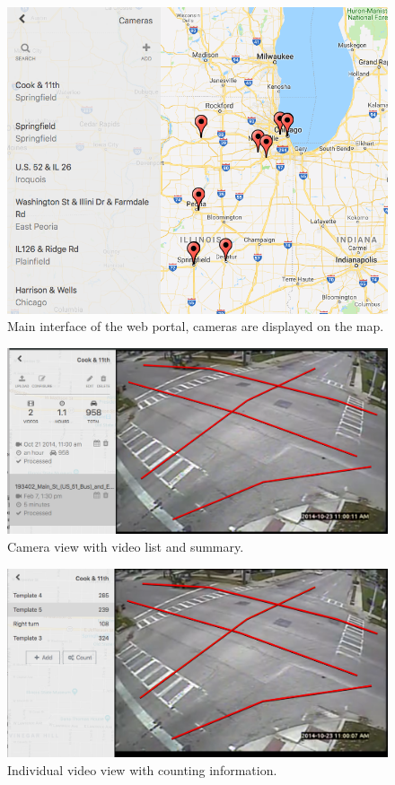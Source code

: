 \begin{figure}
    \centering
    \includegraphics[width=\linewidth]{./img/system/main.png}
    \caption{Main interface of the web portal, cameras are displayed on the map.}
    \label{fig:sys-main}
\end{figure}
\begin{figure}
    \centering
    \includegraphics[width=\linewidth]{./img/system/camera.png}
    \caption{Camera view with video list and summary.}
    \label{fig:sys-camera}
\end{figure}
\begin{figure}
    \centering
    \includegraphics[width=\linewidth]{./img/system/video.png}
    \caption{Individual video view with counting information.}
    \label{fig:sys-video}
\end{figure}